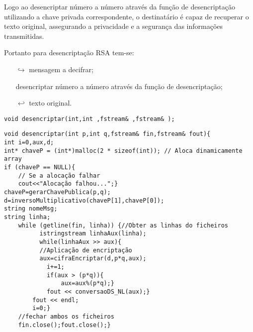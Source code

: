 Logo ao desencriptar número a número através da função de desencriptação utilizando a chave privada correspondente, o destinatário é capaz de recuperar o texto original, assegurando a privacidade e a segurança das informações transmitidas. 

Portanto para desencriptação RSA tem-se:
\begin{itemize}
    \item[$\hookrightarrow$] mensagem a decifrar;
    \item[] desencriptar número a número através da função de desencriptação;
    \item [$\hookleftarrow$] texto original.
\end{itemize}

\begin{lstlisting}[frame=single,mathescape=true,caption={Cifra RSA ---Especificação de \texttt{CifraDesencriptar}},captionpos=b,label={lst:rsacifraDesencriptar},basicstyle=\footnotesize]
void desencriptar(int,int ,fstream& ,fstream& );
\end{lstlisting}

\begin{lstlisting}[frame=single,mathescape=true,caption={Gerar chave privada},captionpos=b,label={lst:Gerar chave privada},basicstyle=\footnotesize]
void desencriptar(int p,int q,fstream& fin,fstream& fout){
int i=0,aux,d;
int* chaveP = (int*)malloc(2 * sizeof(int)); // Aloca dinamicamente array
if (chaveP == NULL){
    // Se a alocação falhar
    cout<<"Alocação falhou...";}
chaveP=gerarChavePublica(p,q);
d=inversoMultiplicativo(chaveP[1],chaveP[0]);
string nomeMsg;
string linha;
    while (getline(fin, linha)) {//Obter as linhas do ficheiros
          istringstream linhaAux(linha);
          while(linhaAux >> aux){
          //Aplicação de encriptação
          aux=cifraEncriptar(d,p*q,aux);
            i+=1;
            if(aux > (p*q)){
                aux=aux%(p*q);}
            fout << conversaoDS_NL(aux);}
        fout << endl;
        i=0;}
    //fechar ambos os ficheiros
    fin.close();fout.close();}
\end{lstlisting}
